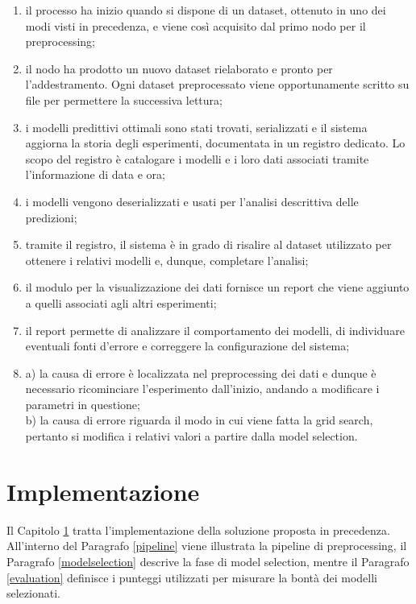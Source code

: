 \documentclass[12pt]{report}
\theoremstyle{definition}
\begin{document}
\begin{enumerate}
    \item il processo ha inizio quando si dispone di un dataset, ottenuto in uno dei modi visti in precedenza, e viene così acquisito dal primo nodo per il preprocessing;
    \item  il nodo ha prodotto un nuovo dataset rielaborato e pronto per l'addestramento. Ogni dataset preprocessato viene opportunamente scritto su file per permettere la successiva lettura;
    \item i modelli predittivi ottimali sono stati trovati, serializzati e il sistema aggiorna la storia degli esperimenti, documentata in un registro dedicato. Lo scopo del registro è catalogare i modelli e i loro dati associati tramite l'informazione di data e ora;
    \item i modelli vengono deserializzati e usati per l'analisi descrittiva delle predizioni;
    \item tramite il registro, il sistema è in grado di risalire al dataset utilizzato per ottenere i relativi modelli e, dunque, completare l'analisi;
    \item il modulo per la visualizzazione dei dati fornisce un report che viene aggiunto a quelli associati agli altri esperimenti;
    \item il report permette di analizzare il comportamento dei modelli, di individuare eventuali fonti d'errore e correggere la configurazione del sistema;
    \item a) la causa di errore è localizzata nel preprocessing dei dati e dunque è necessario ricominciare l'esperimento dall'inizio, andando a modificare i parametri in questione;
    \\
    b) la causa di errore riguarda il modo in cui viene fatta la grid search, pertanto si modifica i relativi valori a partire dalla model selection.
\end{enumerate}

\chapter{Implementazione}
\label{Capitolo 3}
\onehalfspacing
Il Capitolo \ref{Capitolo 3} tratta l'implementazione della soluzione proposta in precedenza.
\\
All'interno del Paragrafo \ref{pipeline} viene illustrata la pipeline di preprocessing, il Paragrafo \ref{modelselection} descrive la fase di model selection, mentre il Paragrafo \ref{evaluation} definisce i punteggi utilizzati per misurare la bontà dei modelli selezionati.
\end{document}
